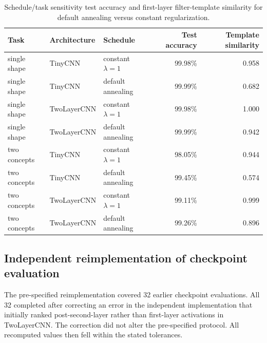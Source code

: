 \begin{table}[h]
\caption{Schedule/task sensitivity test accuracy and first-layer filter-template similarity for default annealing versus constant regularization.}
\label{tab:schedule-endpoints}
\centering
\footnotesize
\setlength{\tabcolsep}{3pt}
\begin{tabular}{lllrr}
\toprule
Task & Architecture & Schedule & Test accuracy & Template similarity \\
\midrule
single shape & TinyCNN & constant $\lambda=1$ & 99.98\% & 0.958 \\
single shape & TinyCNN & default annealing & 99.99\% & 0.682 \\
\addlinespace[2pt]
single shape & TwoLayerCNN & constant $\lambda=1$ & 99.98\% & 1.000 \\
single shape & TwoLayerCNN & default annealing & 99.99\% & 0.942 \\
\addlinespace[2pt]
two concepts & TinyCNN & constant $\lambda=1$ & 98.05\% & 0.944 \\
two concepts & TinyCNN & default annealing & 99.45\% & 0.574 \\
\addlinespace[2pt]
two concepts & TwoLayerCNN & constant $\lambda=1$ & 99.11\% & 0.999 \\
two concepts & TwoLayerCNN & default annealing & 99.26\% & 0.896 \\
\bottomrule
\end{tabular}
\end{table}

\subsection{Independent reimplementation of checkpoint evaluation}\label{app:audit}

The pre-specified reimplementation covered 32 earlier checkpoint evaluations. All 32 completed after correcting an error in the independent implementation that initially ranked post-second-layer rather than first-layer activations in TwoLayerCNN. The correction did not alter the pre-specified protocol. All recomputed values then fell within the stated tolerances.

